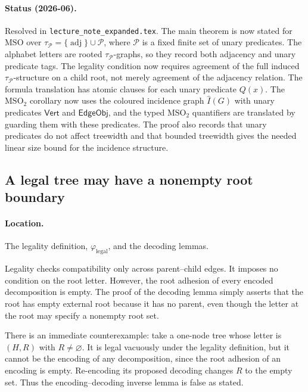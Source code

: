 \documentclass[11pt]{article}
\newcommand{\MSO}{\ensuremath{\mathrm{MSO}}}
\newcommand{\MSOtwo}{\ensuremath{\mathrm{MSO}_2}}
\begin{document}
\paragraph{Status (2026-06).} Resolved in \texttt{lecture\_note\_expanded.tex}.
The main theorem is now stated for \MSO{} over
\(\tau_{\mathcal P}=\{\operatorname{adj}\}\cup\mathcal P\), where
\(\mathcal P\) is a fixed finite set of unary predicates.  The alphabet letters
are rooted \(\tau_{\mathcal P}\)-graphs, so they record both adjacency and unary
predicate tags.  The legality condition now requires agreement of the full
induced \(\tau_{\mathcal P}\)-structure on a child root, not merely agreement of
the adjacency relation.  The formula translation has atomic clauses for each unary
predicate \(Q(x)\).  The \MSOtwo{} corollary now uses the coloured incidence
graph \(\widehat I(G)\) with unary predicates \(\mathsf{Vert}\) and
\(\mathsf{EdgeObj}\), and the typed \MSOtwo{} quantifiers are translated by
guarding them with these predicates.  The proof also records that unary
predicates do not affect treewidth and that bounded treewidth gives the needed
linear size bound for the incidence structure.

\subsection{A legal tree may have a nonempty root boundary}

\paragraph{Location.} The legality definition, \(\varphi_{\mathrm{legal}}\), and the
decoding lemmas.

Legality checks compatibility only across parent--child edges.  It imposes no
condition on the root letter.  However, the root adhesion of every encoded
decomposition is empty.  The proof of the decoding lemma simply asserts that the
root has empty external root because it has no parent, even though the
letter at the root may specify a nonempty root set.

There is an immediate counterexample: take a one-node tree whose letter is
\((H,R)\) with \(R\neq\varnothing\).  It is legal vacuously under the legality
definition,
but it cannot be the encoding of any decomposition, since the root adhesion of
an encoding is empty.  Re-encoding its proposed decoding changes \(R\) to the
empty set.  Thus the encoding--decoding inverse lemma is false as stated.
\end{document}
